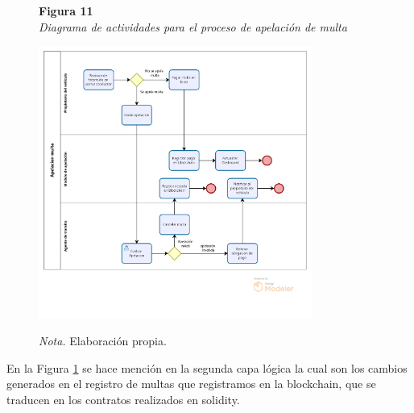  \begin{figure}[htbp]
    \begin{flushleft}
        \textbf{Figura 11}\\[2em]
        \textit{Diagrama de actividades para el proceso de apelación de multa}
    \end{flushleft}
    \vspace{1em}
    \centering
    \includegraphics[width=0.8\textwidth]{Images/ActApelacion.png}
    \vspace{2em}
    \begin{flushleft}
        \textit{Nota.} Elaboración propia.
    \end{flushleft}
    \label{fig:diagrama_apelacion}
\end{figure}

En la Figura \ref{fig:diagrama_apelacion} se hace mención en la segunda capa lógica la cual son los cambios generados en el registro de multas que registramos en la blockchain, que se traducen en los contratos realizados en solidity.

